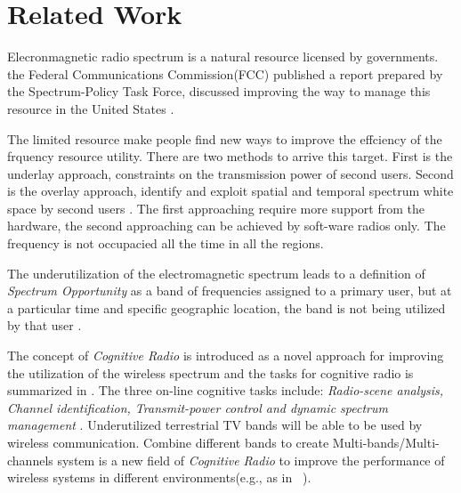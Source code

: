 \section{Related Work}
\label{sec:related}


Elecronmagnetic radio spectrum is a natural resource licensed by governments.  the Federal Communications Commission(FCC) published a report prepared by the Spectrum-Policy Task Force, discussed improving the way to manage this resource in the United States \cite{federal2002spectrum}. 

The limited resource make people find new ways to improve the effciency of the frquency resource utility. There are two methods to arrive this target. First is the underlay approach, constraints on the transmission power of second users. Second is the overlay approach, identify and exploit spatial and temporal spectrum white space by second users \cite{zhao2007survey}.
The first approaching require more support from the hardware, the second approaching can be achieved by soft-ware radios only. The frequency is not occupacied all the time in all the regions.





The underutilization of the electromagnetic spectrum leads to a definition of \emph{Spectrum Opportunity} as a band of frequencies assigned to a primary user, but at a particular time and specific geographic location, the band is not being utilized by that user \cite{kolodzy2001next}.




The concept of \emph{Cognitive Radio} is introduced as a novel approach for improving the utilization of the wireless spectrum and the tasks for cognitive radio is summarized in \cite{haykin2005cognitive}. The three on-line cognitive tasks include: \emph{Radio-scene analysis, Channel identification, Transmit-power control and dynamic spectrum management} \cite{haykin2005cognitive}.
Underutilized terrestrial TV bands will be able to be used by wireless communication. Combine different bands to create Multi-bands/Multi-channels system is a new field of \emph{Cognitive Radio} to improve the performance of wireless systems in different
environments(e.g., as in ~\cite{MOAR}). 

